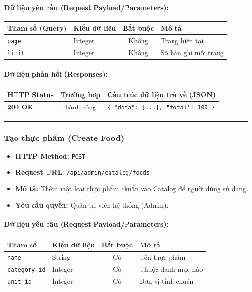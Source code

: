 \documentclass[12pt,a4paper]{article}
\begin{document}
\paragraph{Dữ liệu yêu cầu (Request Payload/Parameters):}
\begin{longtable}{|p{2.8cm}|p{2.2cm}|c|p{7.0cm}|}
\hline
\textbf{Tham số (Query)} & \textbf{Kiểu dữ liệu} & \textbf{Bắt buộc} & \textbf{Mô tả} \\ \hline
\endhead
\texttt{page} & Integer & Không & Trang hiện tại \\ \hline
\texttt{limit} & Integer & Không & Số bản ghi mỗi trang \\ \hline
\end{longtable}

\paragraph{Dữ liệu phản hồi (Responses):}
\begin{longtable}{|p{2.8cm}|p{3.2cm}|p{8.0cm}|}
\hline
\textbf{HTTP Status} & \textbf{Trường hợp} & \textbf{Cấu trúc dữ liệu trả về (JSON)} \\ \hline
\endhead
\textbf{200 OK} & Thành công & \texttt{\{ "data": [...], "total": 100 \}} \\ \hline
\end{longtable}

\vskip 0.4cm
\noindent\rule{\textwidth}{0.3pt}
\vskip 0.4cm

\subsubsection{Tạo thực phẩm (Create Food)}
\begin{itemize}[leftmargin=*]
    \item \textbf{HTTP Method:} \texttt{POST}
    \item \textbf{Request URL:} \texttt{/api/admin/catalog/foods}
    \item \textbf{Mô tả:} Thêm một loại thực phẩm chuẩn vào Catalog để người dùng sử dụng.
    \item \textbf{Yêu cầu quyền:} Quản trị viên hệ thống (Admin).
\end{itemize}

\paragraph{Dữ liệu yêu cầu (Request Payload/Parameters):}
\begin{longtable}{|p{2.8cm}|p{2.2cm}|c|p{7.0cm}|}
\hline
\textbf{Tham số} & \textbf{Kiểu dữ liệu} & \textbf{Bắt buộc} & \textbf{Mô tả} \\ \hline
\endhead
\texttt{name} & String & Có & Tên thực phẩm \\ \hline
\texttt{category\_id} & Integer & Có & Thuộc danh mục nào \\ \hline
\texttt{unit\_id} & Integer & Có & Đơn vị tính chuẩn \\ \hline
\end{longtable}
\end{document}
